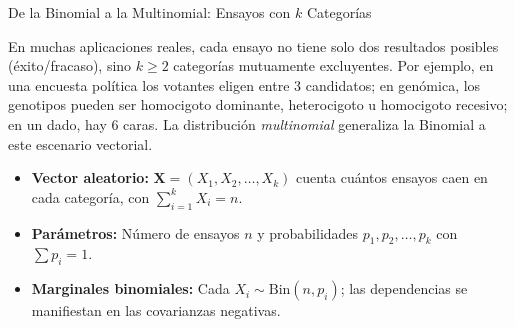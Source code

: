 \documentclass[10pt, aspectratio=169]{beamer}
\begin{document}
\begin{frame}{De la Binomial a la Multinomial: Ensayos con $k$ Categorías}
  \footnotesize
  \begin{motivacion}
    En muchas aplicaciones reales, cada ensayo no tiene solo dos resultados posibles (éxito/fracaso), sino $k \ge 2$ categorías mutuamente excluyentes. Por ejemplo, en una encuesta política los votantes eligen entre 3 candidatos; en genómica, los genotipos pueden ser homocigoto dominante, heterocigoto u homocigoto recesivo; en un dado, hay 6 caras. La distribución \emph{multinomial} generaliza la Binomial a este escenario vectorial.
  \end{motivacion}

  \vspace{0.15cm}
  \pause
  \begin{itemize}\itemsep=0.1cm
    \item \textbf{Vector aleatorio:} $\bm{X} = (X_{1}, X_{2}, \dots, X_{k})$ cuenta cuántos ensayos caen en cada categoría, con $\sum_{i=1}^{k} X_{i} = n$. \pause
    \item \textbf{Parámetros:} Número de ensayos $n$ y probabilidades $p_{1}, p_{2}, \dots, p_{k}$ con $\sum p_{i} = 1$. \pause
    \item \textbf{Marginales binomiales:} Cada $X_{i} \sim \text{Bin}(n, p_{i})$; las dependencias se manifiestan en las covarianzas negativas.
  \end{itemize}
\end{frame}
\end{document}
